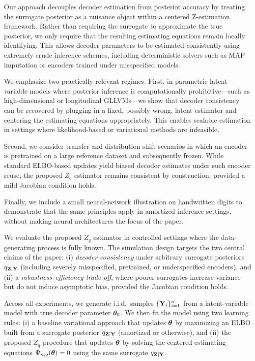 \documentclass[twoside,11pt]{article}
\begin{document}
Our approach decouples decoder estimation from posterior accuracy by treating the surrogate posterior 
as a nuisance object within a centered Z-estimation framework. Rather than requiring the surrogate
to approximate the true posterior, we only require that the resulting estimating equations remain locally identifying. This allows decoder parameters to be estimated consistently using extremely crude inference schemes, including deterministic solvers such as MAP imputation or encoders trained under misspecified models.

We emphasize two practically relevant regimes. First, in parametric latent variable models where posterior inference is computationally prohibitive—such as high-dimensional or longitudinal GLLVMs—we show that decoder consistency can be recovered by plugging in a fixed, possibly wrong, latent estimator and centering the estimating equations appropriately. This enables scalable estimation in settings where likelihood-based or variational methods are infeasible.

Second, we consider transfer and distribution-shift scenarios in which an encoder is pretrained on a large reference dataset and subsequently frozen. While standard ELBO-based updates yield biased decoder estimates under such encoder reuse, the proposed $Z_q$ estimator remains consistent by construction, provided a mild Jacobian condition holds.

Finally, we include a small neural-network illustration on handwritten digits to demonstrate that the same principles apply in amortized inference settings, without making neural architectures the focus of the paper.


We evaluate the proposed $Z_q$ estimator in controlled settings where the data-generating process is fully known.  The simulation design targets the two central claims of the paper: (i) \emph{decoder consistency} under arbitrary surrogate posteriors $q_{{\bf Z}\mid{\bf Y}}$ (including severely misspecified, pretrained, or underspecified encoders), and (ii) a \emph{robustness--efficiency trade-off}, where poorer surrogates increase variance but do not induce asymptotic bias, provided the Jacobian condition holds.

Across all experiments, we generate i.i.d.\ samples $\{{\bf Y}_i\}_{i=1}^n$ from a latent-variable model with true decoder parameter ${\bm{\theta}}_0$.  We then fit the model using two learning rules:
(i) a baseline variational approach that updates ${\bm{\theta}}$ by maximizing an ELBO built from a surrogate posterior $q_{{\bf Z}\mid{\bf Y}}$ (amortized or otherwise), and
(ii) the proposed $Z_q$ procedure that updates ${\bm{\theta}}$ by solving the centered estimating equations $\Psi_{n;q}({\bm{\theta}})=0$ using the same surrogate $q_{{\bf Z}\mid{\bf Y}}$.
\end{document}
